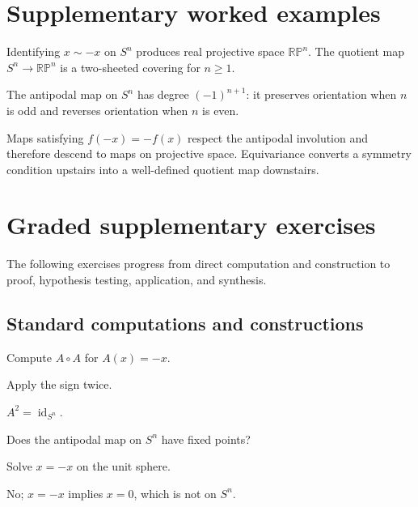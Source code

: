 \section{Supplementary worked examples}
\label{sec:viii04-pedagogy}

\begin{example}\label{ex:viii04-ped-01}
Identifying $x\sim -x$ on $S^n$ produces real projective space $\mathbb{RP}^n$.  The quotient map $S^n\to\mathbb{RP}^n$ is a two-sheeted covering for $n\ge1$.
\end{example}

\begin{example}\label{ex:viii04-ped-02}
The antipodal map on $S^n$ has degree $(-1)^{n+1}$: it preserves orientation when $n$ is odd and reverses orientation when $n$ is even.
\end{example}

\begin{example}\label{ex:viii04-ped-03}
Maps satisfying $f(-x)=-f(x)$ respect the antipodal involution and therefore descend to maps on projective space.  Equivariance converts a symmetry condition upstairs into a well-defined quotient map downstairs.
\end{example}

\section{Graded supplementary exercises}
The following exercises progress from direct computation and construction to proof, hypothesis testing, application, and synthesis.

\subsection*{Standard computations and constructions}

\begin{exercise}\label{exr:viii04-ped-01}
Compute $A\circ A$ for $A(x)=-x$.
\end{exercise}
\begin{hint}
Apply the sign twice.
\end{hint}
\begin{solution}
$A^2=\operatorname{id}_{S^n}$.
\end{solution}

\begin{exercise}\label{exr:viii04-ped-02}
Does the antipodal map on $S^n$ have fixed points?
\end{exercise}
\begin{hint}
Solve $x=-x$ on the unit sphere.
\end{hint}
\begin{solution}
No; $x=-x$ implies $x=0$, which is not on $S^n$.
\end{solution}

